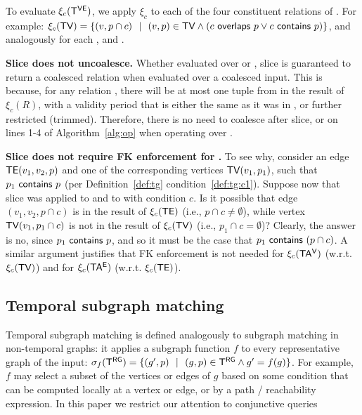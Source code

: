 To evaluate $\xi_c (\mathsf{T^{VE}})$, we apply $\xi_c$ to each of the four
constituent relations of \tve.  For example: 
$\xi_c (\textsf{TV}) = \{ (v, p
\cap c)~~|~~(v, p) \in \textsf{TV} \wedge (c~\mathsf{overlaps}~p \vee c~\mathsf{contains}~p) \}$, 
and analogously for each \te, \tav and \tae.



{\bf Slice does not uncoalesce.} Whether evaluated over \trg or \tve,
slice is guaranteed to return a coalesced relation when evaluated over
a coalesced input.  This is because, for any relation , there
will be at most one tuple from  in the result of $\xi_c (R)$,
with a validity period that is either the same as it was in ,
or further restricted (trimmed).  Therefore, there is no need to
coalesce \trg after slice, or on lines 1-4 of Algorithm~\ref{alg:op}
when operating over \tve.

{\bf Slice does not require FK enforcement for \tve.}  To see why,
consider an edge $\textsf{TE}(v_1, v_2, p)$ and one of the corresponding
vertices $\textsf{TV}(v_1, p_1)$, such that $p_1~\mathsf{contains}~p$ (per
Definition~\ref{def:tg} condition~\ref{def:tg:c1}).  Suppose now that
slice was applied to \tv and to \te with condition $c$.  Is it
possible that edge $(v_1, v_2, p \cap c)$ is in the result of $\xi_c
(\textsf{TE})$ (i.e., $p \cap c \neq \emptyset$), while vertex $\textsf{TV}(v_1, p_1 \cap
c)$ is not in the result of $\xi_c (\textsf{TV})$ (i.e., $p_1 \cap c =
\emptyset$)?  Clearly, the answer is no, since
$p_1~\mathsf{contains}~p$, and so it must be the case that
$p_1~\mathsf{contains}~(p \cap c)$.  A similar argument justifies that
FK enforcement is not needed for $\xi_c(\mathsf{TA^{V}})$ (w.r.t. $\xi_c (\textsf{TV})$) and
for $\xi_c(\mathsf{TA^{E}})$ (w.r.t. $\xi_c (\textsf{TE})$).

\subsection{Temporal subgraph matching}
\label{sec:algebra:subgraph}

Temporal subgraph matching is defined analogously to subgraph matching
in non-temporal graphs: it applies a subgraph function $f$ to every
representative graph of the input: $\sigma_f (\mathsf{T^{RG}}) = \{ (g',
p)~~|~~(g, p) \in \mathsf{T^{RG}} \wedge g' = f(g) \}$.  For example, $f$ may
select a subset of the vertices or edges of $g$ based on some
condition that can be computed locally at a vertex or edge, or by a
path / reachability expression.  In this paper we restrict our
attention to conjunctive queries

